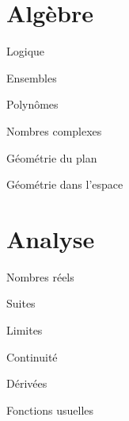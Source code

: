 \documentclass[12pt]{article}
\begin{document}
\part{Algèbre}

\begin{quiz}{Logique}

\end{quiz}

\begin{quiz}{Ensembles}

\end{quiz}

\begin{quiz}{Polynômes}

\end{quiz}

\begin{quiz}{Nombres complexes}

\end{quiz}

\begin{quiz}{Géométrie du plan}

\end{quiz}

\begin{quiz}{Géométrie dans l'espace}

\end{quiz}


\part{Analyse}

\begin{quiz}{Nombres réels}

\end{quiz}

\begin{quiz}{Suites}

\end{quiz}

\begin{quiz}{Limites}

\end{quiz}

\begin{quiz}{Continuité}

\end{quiz}

\begin{quiz}{Dérivées}

\end{quiz}

\begin{quiz}{Fonctions usuelles}

\end{quiz}
\end{document}
